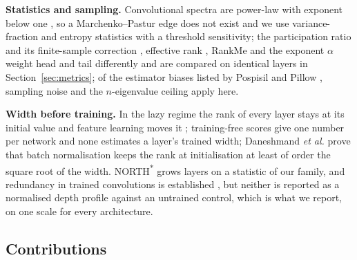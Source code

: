 \documentclass[10pt,journal,compsoc]{IEEEtran}
\begin{document}
\textbf{Statistics and sampling.} Convolutional spectra are power-law with
exponent below one \cite{ghosh2022powerLaws}, so a
Marchenko--Pastur edge does not exist and we use variance-fraction and
entropy statistics with a threshold sensitivity; the participation ratio
and its finite-sample correction \cite{chun2026estimating}, effective rank
\cite{roy2007effectiveRank}, RankMe \cite{garrido2023rankme} and the
exponent $\alpha$ \cite{agrawal2022alphaReq} weight head and tail
differently and are compared on identical layers in
Section~\ref{sec:metrics}; of the estimator biases listed by Pospisil and
Pillow \cite{pospisil2025revisiting}, sampling noise and the
$n$-eigenvalue ceiling apply here.

\textbf{Width before training.} In the lazy regime the rank of every layer
stays at its initial value and feature learning moves it
\cite{yang2021feature}; training-free scores \cite{mellor2021naswot} give one number per network and none
estimates a layer's trained width; Daneshmand \emph{et al.}
\cite{daneshmand2020bn} prove that batch normalisation keeps the rank at
initialisation at least of order the square root of the width.
NORTH\textsuperscript{*} grows layers on a statistic of our family, and
redundancy in trained convolutions is established
\cite{suau2020filterDistillation}, but neither is reported as a
normalised depth profile against an untrained control, which is what we
report, on one scale for every architecture.

\subsection{Contributions}
\end{document}

